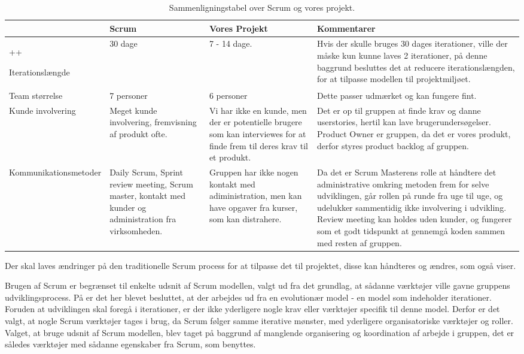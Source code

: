 \begin{sidewaystable}
      \begin{tabular}{p{5cm}p{5cm}p{5cm}p{5cm}}
	       				 & Scrum  & Vores Projekt & Kommentarer  \\ \hline++

	   Iterationslængde  		
	   		& 30 dage 
	   		& 7 - 14 dage. 
	   		& Hvis der skulle bruges 30 dages iterationer, ville der måske kun kunne laves 2 iterationer, på denne baggrund besluttes det at reducere iterationslængden, for at tilpasse modellen til projektmiljøet.\\
	   		
	   Team størrelse    		
	   		& 7 personer
	   		& 6 personer 
	   		& Dette passer udmærket og kan fungere fint. \\
	   		
	   Kunde involvering 		
	   		& Meget kunde involvering, fremvisning af produkt ofte.
	   		& Vi har ikke en kunde, men der er potentielle brugere som kan interviewes for at finde frem til deres krav til et produkt.
	   		& Det er op til gruppen at finde krav og danne userstories, hertil kan lave brugerundersøgelser. Product Owner er gruppen, da det er vores produkt, derfor styres product backlog af gruppen.\\
	   		
	   Kommunikationsmetoder	
	   		& Daily Scrum, Sprint review meeting,  Scrum master, kontakt med kunder og administration fra virksomheden.
	   		& Gruppen har ikke nogen kontakt med adiministration, men kan have opgaver fra kurser, som kan distrahere. 
	   		& Da det er Scrum Masterens rolle at håndtere det administrative omkring metoden frem for selve udviklingen, går rollen på runde fra uge til uge, og udelukker sammentidig ikke involvering i udvikling. Review meeting kan holdes uden kunder, og fungerer som et godt tidspunkt at gennemgå koden sammen med resten af gruppen. \\
    \end{tabular}
  \caption{Sammenligningstabel over Scrum og vores projekt.}\label{tabel:sammenligningstabel}
\end{sidewaystable}

Der skal laves ændringer på den traditionelle Scrum process for at tilpasse det til projektet, disse kan håndteres og ændres, som  også viser.

Brugen af Scrum er begrænset til enkelte udsnit af Scrum modellen, valgt ud fra det grundlag, at sådanne værktøjer ville gavne gruppens udviklingsprocess.
På  er det her blevet besluttet, at der arbejdes ud fra en evolutionær model - en model som indeholder iterationer.
Foruden at udviklingen skal foregå i iterationer, er der ikke yderligere nogle krav eller værktøjer specifik til denne model.
Derfor er det valgt, at nogle Scrum værktøjer tages i brug, da Scrum følger samme iterative mønster, med yderligere organisatoriske værktøjer og roller.
Valget, at bruge udsnit af Scrum modellen, blev taget på baggrund af manglende organisering og koordination af arbejde i gruppen, det er således værktøjer med sådanne egenskaber fra Scrum, som benyttes.


